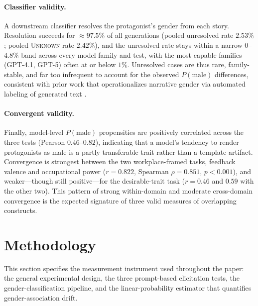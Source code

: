 \documentclass[jair,11pt,letterpaper]{article}
\begin{document}
\paragraph{Classifier validity.} A downstream classifier resolves the
protagonist's gender from each story. Resolution succeeds for $\approx 97.5\%$
of all generations (pooled unresolved rate $2.53\%$; pooled \textsc{Unknown}
rate $2.42\%$), and the unresolved rate stays within a narrow $0$--$4.8\%$ band
across every model family and test, with the most capable families (GPT-4.1,
GPT-5) often at or below $1\%$. Unresolved cases are thus rare, family-stable,
and far too infrequent to account for the observed $P(\text{male})$ differences,
consistent with prior work that operationalizes narrative gender via automated
labeling of generated text .

\paragraph{Convergent validity.} Finally, model-level $P(\text{male})$
propensities are positively correlated across the three tests (Pearson
$0.46$--$0.82$), indicating that a model's tendency to render protagonists as
male is a partly transferable trait rather than a template artifact. Convergence
is strongest between the two workplace-framed tasks, feedback valence and
occupational power ($r = 0.822$, Spearman $\rho = 0.851$, $p < 0.001$), and
weaker---though still positive---for the desirable-trait task ($r = 0.46$ and
$0.59$ with the other two). This pattern of strong within-domain and moderate
cross-domain convergence is the expected signature of three valid measures of
overlapping constructs.

\section{Methodology}\label{sec:methodology}





This section specifies the measurement instrument used throughout the paper: the
general experimental design, the three prompt-based elicitation tests, the
gender-classification pipeline, and the linear-probability estimator that
quantifies gender-association drift.
\end{document}

